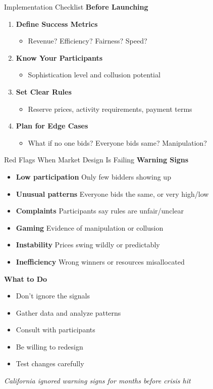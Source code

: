 \documentclass[xcolor={x11names}]{beamer}
\begin{document}
\begin{frame}{Implementation Checklist}
\textbf{Before Launching}
\begin{enumerate}
  \item \textbf{Define Success Metrics}
  \begin{itemize}
    \item Revenue? Efficiency? Fairness? Speed?
  \end{itemize}
  
  \item \textbf{Know Your Participants}
  \begin{itemize}
    \item Sophistication level and collusion potential
  \end{itemize}
  
  \item \textbf{Set Clear Rules}
  \begin{itemize}
    \item Reserve prices, activity requirements, payment terms
  \end{itemize}
  
  \item \textbf{Plan for Edge Cases}
  \begin{itemize}
    \item What if no one bids? Everyone bids same? Manipulation?
  \end{itemize}
  
\end{enumerate}
\end{frame}

\begin{frame}{Red Flags When Market Design Is Failing}
\textbf{Warning Signs}
\begin{itemize}
  \item \textbf{Low participation} Only few bidders showing up
  \item \textbf{Unusual patterns} Everyone bids the same, or very high/low
  \item \textbf{Complaints} Participants say rules are unfair/unclear
  \item \textbf{Gaming} Evidence of manipulation or collusion
  \item \textbf{Instability} Prices swing wildly or predictably
  \item \textbf{Inefficiency} Wrong winners or resources misallocated
\end{itemize}


\textbf{What to Do}
\begin{itemize}
  \item Don't ignore the signals
  \item Gather data and analyze patterns
  \item Consult with participants
  \item Be willing to redesign
  \item Test changes carefully
\end{itemize}


\textit{California ignored warning signs for months before crisis hit}
\end{frame}
\end{document}
